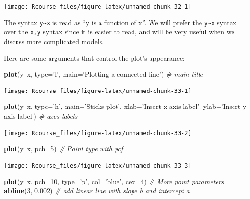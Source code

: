\documentclass[]{book}
\newenvironment{Shaded}{\begin{snugshade}}{\end{snugshade}}
\newcommand{\KeywordTok}[1]{\textcolor[rgb]{0.13,0.29,0.53}{\textbf{{#1}}}}
\newcommand{\DataTypeTok}[1]{\textcolor[rgb]{0.13,0.29,0.53}{{#1}}}
\newcommand{\DecValTok}[1]{\textcolor[rgb]{0.00,0.00,0.81}{{#1}}}
\newcommand{\FloatTok}[1]{\textcolor[rgb]{0.00,0.00,0.81}{{#1}}}
\newcommand{\StringTok}[1]{\textcolor[rgb]{0.31,0.60,0.02}{{#1}}}
\newcommand{\CommentTok}[1]{\textcolor[rgb]{0.56,0.35,0.01}{\textit{{#1}}}}
\newcommand{\NormalTok}[1]{{#1}}
\theoremstyle{definition}
\theoremstyle{definition}
\theoremstyle{remark}
\begin{document}
\texttt{[image: Rcourse\_files/figure-latex/unnamed-chunk-32-1]}

The syntax \texttt{y\textasciitilde{}x} is read as ``y is a function of
x''. We will prefer the \texttt{y\textasciitilde{}x} syntax over the
\texttt{x,y} syntax since it is easier to read, and will be very useful
when we discuss more complicated models.

Here are some arguments that control the plot's appearance:

\begin{Shaded}
\begin{Highlighting}[]
\KeywordTok{plot}\NormalTok{(y~x, }\DataTypeTok{type=}\StringTok{'l'}\NormalTok{, }\DataTypeTok{main=}\StringTok{'Plotting a connected line'}\NormalTok{) }\CommentTok{# main title}
\end{Highlighting}
\end{Shaded}

\texttt{[image: Rcourse\_files/figure-latex/unnamed-chunk-33-1]}

\begin{Shaded}
\begin{Highlighting}[]
\KeywordTok{plot}\NormalTok{(y~x, }\DataTypeTok{type=}\StringTok{'h'}\NormalTok{, }\DataTypeTok{main=}\StringTok{'Sticks plot'}\NormalTok{, }\DataTypeTok{xlab=}\StringTok{'Insert x axis label'}\NormalTok{, }\DataTypeTok{ylab=}\StringTok{'Insert y axis label'}\NormalTok{) }\CommentTok{# axes labels}
\end{Highlighting}
\end{Shaded}

\texttt{[image: Rcourse\_files/figure-latex/unnamed-chunk-33-2]}

\begin{Shaded}
\begin{Highlighting}[]
\KeywordTok{plot}\NormalTok{(y~x, }\DataTypeTok{pch=}\DecValTok{5}\NormalTok{) }\CommentTok{# Point type with pcf}
\end{Highlighting}
\end{Shaded}

\texttt{[image: Rcourse\_files/figure-latex/unnamed-chunk-33-3]}

\begin{Shaded}
\begin{Highlighting}[]
\KeywordTok{plot}\NormalTok{(y~x, }\DataTypeTok{pch=}\DecValTok{10}\NormalTok{, }\DataTypeTok{type=}\StringTok{'p'}\NormalTok{, }\DataTypeTok{col=}\StringTok{'blue'}\NormalTok{, }\DataTypeTok{cex=}\DecValTok{4}\NormalTok{) }\CommentTok{# More point parameters}
\KeywordTok{abline}\NormalTok{(}\DecValTok{3}\NormalTok{, }\FloatTok{0.002}\NormalTok{) }\CommentTok{# add linear line with slope b and intercept a}
\end{Highlighting}
\end{Shaded}
\end{document}
